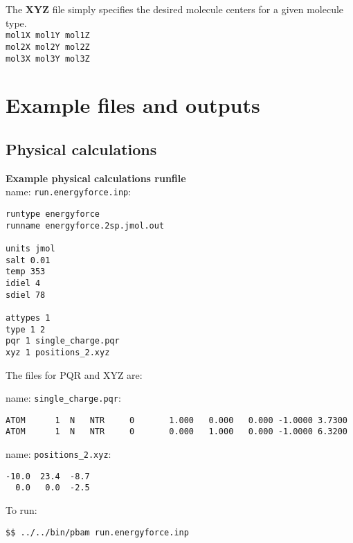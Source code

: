 \medskip\medskip\medskip \medskip

The \textbf{XYZ} file simply specifies the desired molecule centers for a given molecule type. \\

\texttt{mol1X  mol1Y  mol1Z }\\
\texttt{mol2X  mol2Y  mol2Z }\\
\texttt{mol3X  mol3Y  mol3Z }\\

\clearpage




\chapter{Example files and outputs}

\section{Physical calculations}

\textbf{Example physical calculations runfile} \\

name:  \texttt{run.energyforce.inp}:
\begin{lstlisting}[style = MyBash]
runtype energyforce
runname energyforce.2sp.jmol.out

units jmol
salt 0.01
temp 353
idiel 4 
sdiel 78

attypes 1
type 1 2
pqr 1 single_charge.pqr
xyz 1 positions_2.xyz
\end{lstlisting}
\medskip

The files for PQR and XYZ are: 

name:  \texttt{single\_charge.pqr}:
\begin{lstlisting}[style = MyBash]
ATOM      1  N   NTR     0       1.000   0.000   0.000 -1.0000 3.7300
ATOM      1  N   NTR     0       0.000   1.000   0.000 -1.0000 6.3200
\end{lstlisting}

\medskip

name:  \texttt{positions\_2.xyz}:
\begin{lstlisting}[style = MyBash]
-10.0  23.4  -8.7
  0.0   0.0  -2.5
\end{lstlisting}
\medskip

To run: 
\begin{lstlisting}[style = MyBash]
$$ ../../bin/pbam run.energyforce.inp
\end{lstlisting}
\medskip

